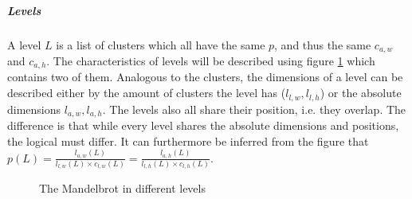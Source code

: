 \documentclass[10pt,a4paper,titlepage]{article}
\begin{document}
	\subparagraph{Levels}\label{sec:levels}
	A level \(L\) is a list of clusters which all have the same \(p\), and thus the same \(c_{a,w}\) and \(c_{a,h}\). The characteristics of levels will be described using figure \ref{fig:man_level} which contains two of them. Analogous to the clusters, the dimensions of a level can be described either by the amount of clusters the level has (\(l_{l,w},l_{l,h}\)) or the absolute dimensions \(l_{a,w},l_{a,h}\). The levels also all share their position, i.e. they overlap. The difference is that while every level shares the absolute dimensions and positions, the logical must differ. It can furthermore be inferred from the figure that \(p(L) = \frac{l_{a,w}(L)}{l_{l,w}(L) \times c_{l,w}(L)} = \frac{l_{a,h}(L)}{l_{l,h}(L) \times c_{l,h}(L)}\).
	\begin{figure}
		\centering
		\caption{The Mandelbrot in different levels}
		\label{fig:man_level}
		\begin{minipage}{.4\textwidth}
			\centering
		\end{minipage}

\end{figure}
\end{document}
